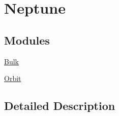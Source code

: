 \hypertarget{group___e_g_x_phys-_constants-_astrophysics-_solar_system-_neptune}{}\section{Neptune}
\label{group___e_g_x_phys-_constants-_astrophysics-_solar_system-_neptune}
\subsection*{Modules}
\begin{DoxyCompactItemize}
\item 
\mbox{\hyperlink{group___e_g_x_phys-_constants-_astrophysics-_solar_system-_neptune-_bulk}{Bulk}}
\item 
\mbox{\hyperlink{group___e_g_x_phys-_constants-_astrophysics-_solar_system-_neptune-_orbit}{Orbit}}
\end{DoxyCompactItemize}


\subsection{Detailed Description}
